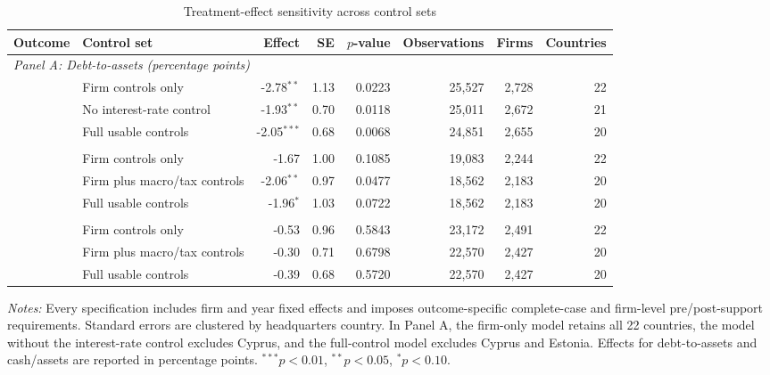 \begin{table}[H]
    \caption{Treatment-effect sensitivity across control sets}
    \label{tab:robustness_control_sets}
    \centering
    \footnotesize
    \begin{adjustbox}{max width=\textwidth}
    \begin{tabular}{llrrrrrr}
        \toprule
        Outcome & Control set & Effect & SE & \(p\)-value & Observations & Firms & Countries \\
        \midrule
        \multicolumn{8}{l}{\textit{Panel A: Debt-to-assets (percentage points)}} \\
        & Firm controls only & -2.78\(^{**}\) & 1.13 & 0.0223 & 25,527 & 2,728 & 22 \\
        & No interest-rate control & -1.93\(^{**}\) & 0.70 & 0.0118 & 25,011 & 2,672 & 21 \\
        & Full usable controls & -2.05\(^{***}\) & 0.68 & 0.0068 & 24,851 & 2,655 & 20 \\
        \addlinespace
        \multicolumn{8}{l}{\textit{Panel B: Adjusted earnings volatility}} \\
        & Firm controls only & -1.67 & 1.00 & 0.1085 & 19,083 & 2,244 & 22 \\
        & Firm plus macro/tax controls & -2.06\(^{**}\) & 0.97 & 0.0477 & 18,562 & 2,183 & 20 \\
        & Full usable controls & -1.96\(^{*}\) & 1.03 & 0.0722 & 18,562 & 2,183 & 20 \\
        \addlinespace
        \multicolumn{8}{l}{\textit{Panel C: Cash/assets (percentage points)}} \\
        & Firm controls only & -0.53 & 0.96 & 0.5843 & 23,172 & 2,491 & 22 \\
        & Firm plus macro/tax controls & -0.30 & 0.71 & 0.6798 & 22,570 & 2,427 & 20 \\
        & Full usable controls & -0.39 & 0.68 & 0.5720 & 22,570 & 2,427 & 20 \\
        \bottomrule
    \end{tabular}
    \end{adjustbox}
    \parbox{\textwidth}{\vspace{0.35em}\footnotesize\textit{Notes:} Every specification includes firm and year fixed effects and imposes outcome-specific complete-case and firm-level pre/post-support requirements. Standard errors are clustered by headquarters country. In Panel A, the firm-only model retains all 22 countries, the model without the interest-rate control excludes Cyprus, and the full-control model excludes Cyprus and Estonia. Effects for debt-to-assets and cash/assets are reported in percentage points. \(^{***}p<0.01\), \(^{**}p<0.05\), \(^{*}p<0.10\).}
\end{table}
